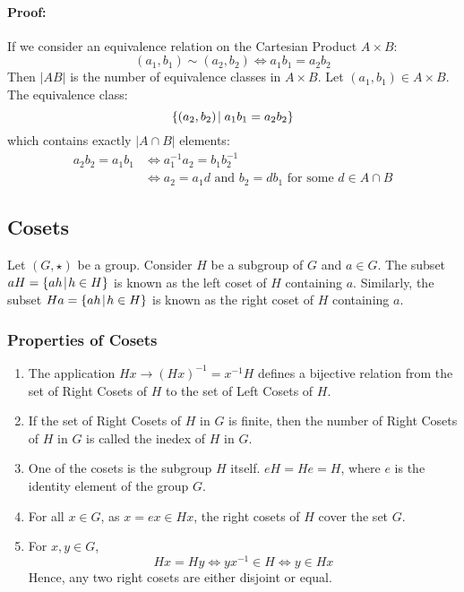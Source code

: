 \documentclass[12pt, oneside]{book}
\begin{document}
\paragraph{Proof:} If we consider an equivalence relation on the Cartesian Product \( A \times B \):
\[ \left( a_1, b_1 \right) \sim \left( a_2, b_2 \right) \Leftrightarrow a_1 b_1 = a_2 b_2 \]
Then \(\left|AB\right|\) is the number of equivalence classes in \(A \times B\).
Let \( \left(a_1, b_1\right) \in A \times B \).
The equivalence class:
\[ \{ \left(a_2, b_2\right) \: \vline \: a_1 b_1 = a_2 b_2 \} \]
which contains exactly \(\left|A \cap B\right|\) elements:
\begin{align*}
	a_2 b_2 = a_1 b_1 & \Leftrightarrow a_1^{-1} a_2 = b_1 b_2^{-1}                                           \\
	                  & \Leftrightarrow a_2 = a_1 d \text{ and } b_2 = d b_1 \text{ for some } d \in A \cap B
\end{align*}

\subsection{Cosets}
Let \(\left( G, \star \right) \) be a group.
Consider \(H\) be a subgroup of \(G\) and \(a \in G\).
The subset \(aH = \{ah \: \vline \: h \in H\}\) is known as the left coset of \(H\) containing \(a\).
Similarly, the subset \( Ha = \{ah \: \vline \: h \in H\} \) is known as the right coset of \(H\) containing \(a\).

\subsubsection{Properties of Cosets}
\begin{enumerate}
	\item The application \(Hx \rightarrow \left(Hx \right)^{-1} = x^{-1} H \) defines a bijective relation from the set of Right Cosets of \(H\) to the set of Left Cosets of \(H\).
	\item If the set of Right Cosets of \(H\) in \(G\) is finite, then the number of Right Cosets of \(H\) in \(G\) is called the inedex of \(H\) in \(G\).
	\item One of the cosets is the subgroup \(H\) itself. \(eH = He = H\), where \(e\) is the identity element of the group \(G\).
	\item For all \(x \in G \), as \( x = ex \in Hx \), the right cosets of \(H\) cover the set \(G\).
	\item For \(x,y \in G \),
	      \[ Hx = Hy \Leftrightarrow yx^{-1} \in H \Leftrightarrow y \in Hx \]
	      Hence, any two right cosets are either disjoint or equal.
\end{enumerate}
\end{document}
